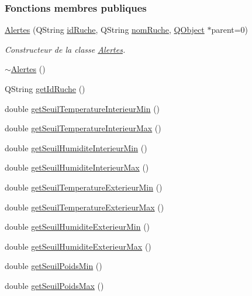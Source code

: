 \subsubsection*{Fonctions membres publiques}
\begin{DoxyCompactItemize}
\item 
\hyperlink{class_alertes_ad2e4e3907f97bdd06840dfeee0a87ddb}{Alertes} (Q\+String \hyperlink{class_alertes_ae3f9d7aa34ab3c83a66c8484e2b89925}{id\+Ruche}, Q\+String \hyperlink{class_alertes_a212f2a7185bcc7b11f3e54200272bdcf}{nom\+Ruche}, \hyperlink{class_q_object}{Q\+Object} $\ast$parent=0)
\begin{DoxyCompactList}\small\item\em Constructeur de la classe \hyperlink{class_alertes}{Alertes}. \end{DoxyCompactList}\item 
\hyperlink{class_alertes_a730b10861d04de9944b30b11c6b3c3af}{$\sim$\+Alertes} ()
\item 
Q\+String \hyperlink{class_alertes_a2374f9e3e5dc95eacaa4eaa5d98540a7}{get\+Id\+Ruche} ()
\item 
double \hyperlink{class_alertes_af61b11556d97f923cf7dd25ac4f5dd05}{get\+Seuil\+Temperature\+Interieur\+Min} ()
\item 
double \hyperlink{class_alertes_ac514ebef5e7e65aa7bee0ebe3cd7e883}{get\+Seuil\+Temperature\+Interieur\+Max} ()
\item 
double \hyperlink{class_alertes_a40d47b65952035b78cac05b915ad57b8}{get\+Seuil\+Humidite\+Interieur\+Min} ()
\item 
double \hyperlink{class_alertes_a86e0bb83ac1fa5e704e3b7b3fc7147cd}{get\+Seuil\+Humidite\+Interieur\+Max} ()
\item 
double \hyperlink{class_alertes_a4451c6b077256d838e584a073444d83d}{get\+Seuil\+Temperature\+Exterieur\+Min} ()
\item 
double \hyperlink{class_alertes_a00d834877e1fc34d7e0659ef6963ac4f}{get\+Seuil\+Temperature\+Exterieur\+Max} ()
\item 
double \hyperlink{class_alertes_a68e467e042b615f56347a0953d6e64f1}{get\+Seuil\+Humidite\+Exterieur\+Min} ()
\item 
double \hyperlink{class_alertes_ad2c8daf5668f5d122efb9b84f7ea86de}{get\+Seuil\+Humidite\+Exterieur\+Max} ()
\item 
double \hyperlink{class_alertes_a228829e2826ee20cc014b2eb54addf14}{get\+Seuil\+Poids\+Min} ()
\item 
double \hyperlink{class_alertes_a2c19b460f7f7cc7a867b5ed634371878}{get\+Seuil\+Poids\+Max} ()

\end{DoxyCompactItemize}
